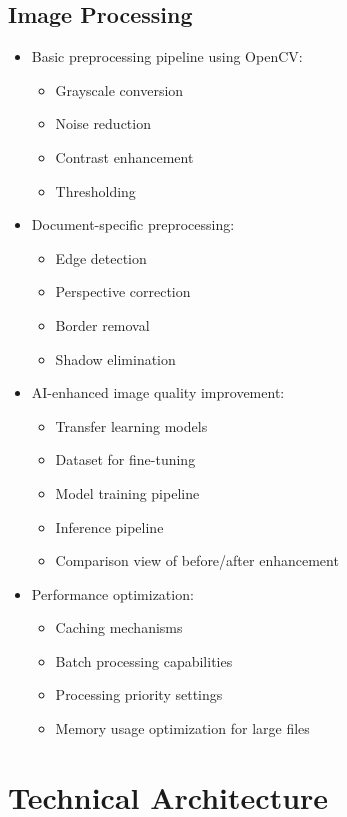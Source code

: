 \documentclass[12pt]{article}
\begin{document}
\subsection{Image Processing}
\begin{itemize}
    \item Basic preprocessing pipeline using OpenCV:
    \begin{itemize}
        \item Grayscale conversion
        \item Noise reduction
        \item Contrast enhancement
        \item Thresholding
    \end{itemize}
    \item Document-specific preprocessing:
    \begin{itemize}
        \item Edge detection
        \item Perspective correction
        \item Border removal
        \item Shadow elimination
    \end{itemize}
    \item AI-enhanced image quality improvement:
    \begin{itemize}
        \item Transfer learning models
        \item Dataset for fine-tuning
        \item Model training pipeline
        \item Inference pipeline
        \item Comparison view of before/after enhancement
    \end{itemize}
    \item Performance optimization:
    \begin{itemize}
        \item Caching mechanisms
        \item Batch processing capabilities
        \item Processing priority settings
        \item Memory usage optimization for large files
    \end{itemize}
\end{itemize}

\section{Technical Architecture}
\end{document}

